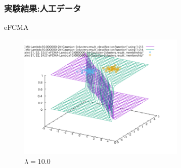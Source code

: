 \documentclass[13pt,dvipdfmx]{beamer}
\begin{document}
\begin{frame}\frametitle{実験結果:人工データ}
  \begin{block}{eFCMA}
   \begin{figure}[htbp]
    \begin{center}
    \includegraphics[height=60mm]{eFCMA-Lambda10.png}
   \end{center}
   \captionsetup{labelformat=empty,labelsep=none}
   \caption{$\lambda=10.0$}
  \end{figure}
 \end{block}
\end{frame}
\end{document}
